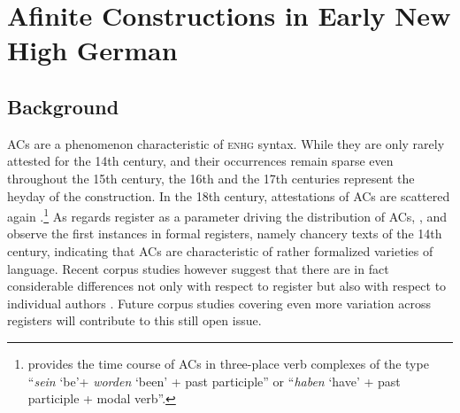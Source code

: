 \documentclass[output=paper,colorlinks,citecolor=brown]{langscibook}
\begin{document}
\section{Afinite Constructions in Early New High German \label{data}}

\subsection{Background \label{background}}
ACs are a phenomenon characteristic of \textsc{enhg} syntax. While they are only rarely attested for the 14th century, and their occurrences remain sparse even throughout the 15th century, the 16th and the 17th centuries represent the heyday of the construction. In the 18th century, attestations of ACs are scattered  again \citep{admoni80,haerd81,breitbarth2005,ERSW93}.\footnote{\citet[171, 172]{haerd81} provides the time course of ACs in three-place verb complexes of the type ``\textit{sein} `be'+ \textit{worden} `been' + past participle'' or ``\textit{haben} `have' + past participle + modal verb''.} As regards register as a parameter driving the distribution of ACs, \citet{admoni67}, \citet{biener25} and \citet{stammler54} observe the first instances in formal registers, namely chancery texts of the 14th century, indicating that ACs are characteristic of rather formalized varieties of language. Recent corpus studies however suggest that there are in fact considerable differences not only with respect to register but also with respect to individual authors \citep{breitbarth2005,thomas2018}. Future corpus studies covering even more variation across registers will contribute to this still open issue.  
\end{document}

